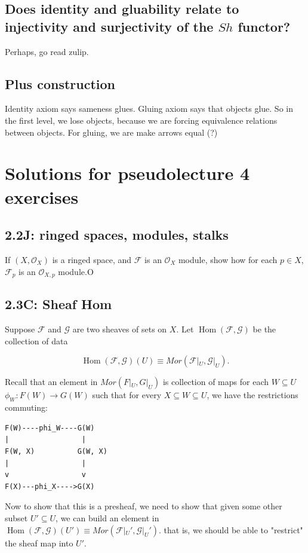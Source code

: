 \documentclass{book}
\newcommand{\Hom}{\operatorname{Hom}}
\newcommand{\F}{\ensuremath{\mathcal{F}}}
\newcommand{\G}{\ensuremath{\mathcal{G}}}
\renewcommand{\O}{\ensuremath{\mathcal{O}}}
\theoremstyle{definition}
\begin{document}
\section{Does identity and gluability relate to injectivity and surjectivity of the $Sh$ functor?}
Perhaps, go read zulip.


\section{Plus construction}
Identity axiom says sameness glues. Gluing axiom says that objects glue. So 
in the first level, we lose objects, because we are forcing equivalence relations
between objects. For gluing, we are make arrows equal (?)

\chapter{Solutions for pseudolecture 4 exercises}

\section{2.2J: ringed spaces, modules, stalks}
    
If $(X, \O_X)$ is a ringed space, and $\F$ is an $\O_X$ module, show how
for each $p \in X$, $\F_p$ is an $\O_{X, p}$ module.O 


\section{2.3C: Sheaf Hom}
Suppose $\F$ and $\G$ are two sheaves of sets on $X$. Let $\Hom(\F, \G)$
be the collection of data

$$
\Hom(\F, \G)(U) \equiv Mor(\F|_U, \G|_U).
$$

Recall that an element in $Mor(F|_U, G|_U)$ is collection of maps for
each $W \subseteq U$
$\phi_W: F(W) \rightarrow G(W)$ such that for every $X \subseteq W \subseteq U$,
we have the restrictions commuting:

\begin{verbatim}
F(W)----phi_W----G(W)
|                 |
F(W, X)          G(W, X)
|                 |
v                 v
F(X)---phi_X---->G(X)
\end{verbatim}

Now to show that this is a presheaf, we need to show that given some other
subset $U' \subseteq U$, we can build an element in
$\Hom(\F, \G)(U') \equiv Mor(\F|_U', \G|_U')$. that is, we should be able
to "restrict" the sheaf map into $U'$.
\end{document}

